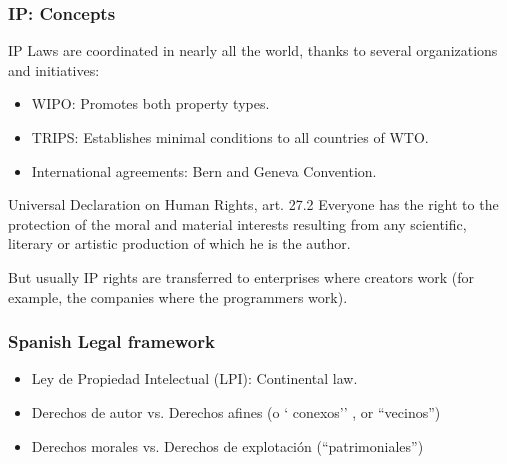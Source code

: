
\begin{frame}
\frametitle{IP: Concepts}

IP Laws are coordinated in nearly all the world, thanks to several
organizations and initiatives:
\begin{itemize}
\item WIPO: Promotes both property types.
\item TRIPS: Establishes minimal conditions to all countries of WTO.
\item International agreements: Bern and Geneva Convention. 
\end{itemize}

\begin{block}{Universal Declaration on Human Rights, art. 27.2}
Everyone has the right to the protection of the moral and material interests resulting from any scientific, literary or artistic production of which he is the author.
\end{block}

\small
But usually IP rights are transferred to enterprises where creators
work (for example, the companies where the programmers work).

\normalsize

\end{frame}


\begin{frame}
\frametitle{Spanish Legal framework}

\begin{itemize}
\item Ley de Propiedad Intelectual (LPI): Continental law. 
\item Derechos de autor vs. Derechos afines (o ` conexos'' , or ``vecinos'') 
\item Derechos morales vs. Derechos de explotación (``patrimoniales'')
\end{itemize}

\end{frame}




